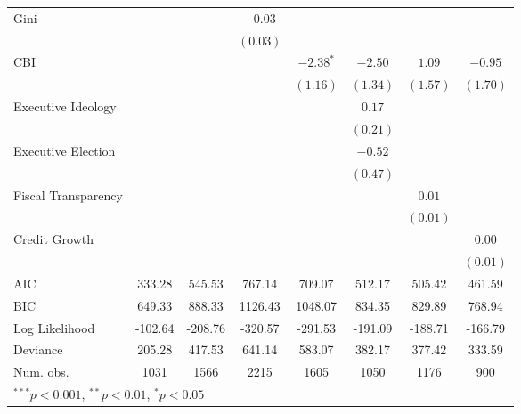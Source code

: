 \begin{tabular}{l c c c c c c c }
Gini                          &               &               & $-0.03$      &              &             &               &            \\
                              &               &               & $(0.03)$     &              &             &               &            \\
CBI                           &               &               &              & $-2.38^{*}$  & $-2.50$     & $1.09$        & $-0.95$    \\
                              &               &               &              & $(1.16)$     & $(1.34)$    & $(1.57)$      & $(1.70)$   \\
Executive Ideology            &               &               &              &              & $0.17$      &               &            \\
                              &               &               &              &              & $(0.21)$    &               &            \\
Executive Election            &               &               &              &              & $-0.52$     &               &            \\
                              &               &               &              &              & $(0.47)$    &               &            \\
Fiscal Transparency           &               &               &              &              &             & $0.01$        &            \\
                              &               &               &              &              &             & $(0.01)$      &            \\
Credit Growth                 &               &               &              &              &             &               & $0.00$     \\
                              &               &               &              &              &             &               & $(0.01)$   \\
\hline
AIC                           & 333.28        & 545.53        & 767.14       & 709.07       & 512.17      & 505.42        & 461.59     \\
BIC                           & 649.33        & 888.33        & 1126.43      & 1048.07      & 834.35      & 829.89        & 768.94     \\
Log Likelihood                & -102.64       & -208.76       & -320.57      & -291.53      & -191.09     & -188.71       & -166.79    \\
Deviance                      & 205.28        & 417.53        & 641.14       & 583.07       & 382.17      & 377.42        & 333.59     \\
Num. obs.                     & 1031          & 1566          & 2215         & 1605         & 1050        & 1176          & 900        \\
\hline
\multicolumn{8}{l}{\scriptsize{$^{***}p<0.001$, $^{**}p<0.01$, $^*p<0.05$}}
\end{tabular}
